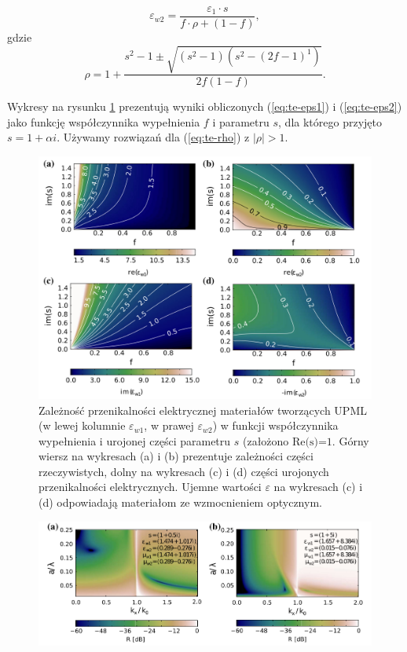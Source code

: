 \begin{equation}
	\varepsilon_{w2}=\frac{\varepsilon_1 \cdot s}{f\cdot \rho + (1-f)},
	\label{eq:te-eps2}
\end{equation}
gdzie
\begin{equation}
	\rho = 1+\frac{s^2-1 \pm \sqrt{(s^2-1)(s^2-(2f-1)^1)}}{2f(1-f)}.
	\label{eq:te-rho}
\end{equation}

Wykresy na rysunku \ref{fig:upml-eps-s-f} prezentują wyniki obliczonych (\ref{eq:te-eps1}) i (\ref{eq:te-eps2}) jako funkcję współczynnika wypełnienia $f$ i parametru $s$, dla którego przyjęto $s=1+\alpha i$. Używamy rozwiązań dla (\ref{eq:te-rho}) z $|\rho|>1$.




\begin{figure}[tb]
	\includegraphics[width=\textwidth]{images/pml/oqe_materials.png}
	\caption{Zależność przenikalności elektrycznej materiałów tworzących UPML (w lewej kolumnie $\varepsilon_{w1}$, w prawej $\varepsilon_{w2}$) w funkcji współczynnika wypełnienia i urojonej części parametru $s$ (założono $\textrm{Re(s)=1}$. Górny wiersz na wykresach (a) i (b) prezentuje zależności części rzeczywistych, dolny na wykresach (c) i (d) części urojonych przenikalności elektrycznych. Ujemne wartości $\varepsilon$ na wykresach (c) i (d) odpowiadają materiałom ze wzmocnieniem optycznym. }
	\label{fig:upml-eps-s-f}
\end{figure}

\begin{figure}[tb]
	\includegraphics[width=\textwidth]{images/pml/fig3.png}
\end{figure}

